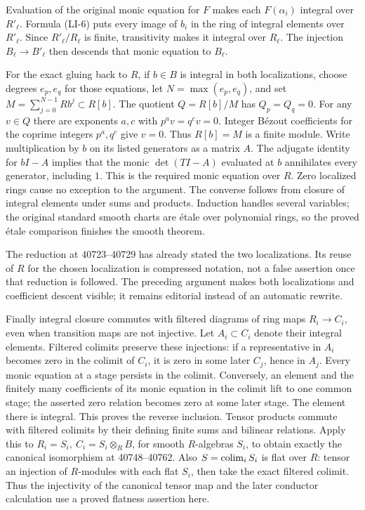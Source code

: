 Evaluation of the original monic equation for \(F\) makes each \(F(\alpha_i)\) integral over \(R'_\ell\). Formula (LI-6) puts every image of \(b_i\) in the ring of integral elements over \(R'_\ell\). Since \(R'_\ell/R_\ell\) is finite, transitivity makes it integral over \(R_\ell\). The injection \(B_\ell\to B'_\ell\) then descends that monic equation to \(B_\ell\).

For the exact gluing back to \(R\), if \(b\in B\) is integral in both localizations, choose degrees \(e_p,e_q\) for those equations, let \(N=\max(e_p,e_q)\), and set \(M=\sum_{j=0}^{N-1}Rb^j\subset R[b]\). The quotient \(Q=R[b]/M\) has \(Q_p=Q_q=0\). For any \(v\in Q\) there are exponents \(a,c\) with \(p^av=q^cv=0\). Integer Bézout coefficients for the coprime integers \(p^a,q^c\) give \(v=0\). Thus \(R[b]=M\) is a finite module. Write multiplication by \(b\) on its listed generators as a matrix \(A\). The adjugate identity for \(bI-A\) implies that the monic \(\det(TI-A)\) evaluated at \(b\) annihilates every generator, including \(1\). This is the required monic equation over \(R\). Zero localized rings cause no exception to the argument. The converse follows from closure of integral elements under sums and products. Induction handles several variables; the original standard smooth charts are étale over polynomial rings, so the proved étale comparison finishes the smooth theorem.

The reduction at 40723--40729 has already stated the two localizations. Its reuse of \(R\) for the chosen localization is compressed notation, not a false assertion once that reduction is followed. The preceding argument makes both localizations and coefficient descent visible; it remains editorial instead of an automatic rewrite.

Finally integral closure commutes with filtered diagrams of ring maps \(R_i\to C_i\), even when transition maps are not injective. Let \(A_i\subset C_i\) denote their integral elements. Filtered colimits preserve these injections: if a representative in \(A_i\) becomes zero in the colimit of \(C_i\), it is zero in some later \(C_j\), hence in \(A_j\). Every monic equation at a stage persists in the colimit. Conversely, an element and the finitely many coefficients of its monic equation in the colimit lift to one common stage; the asserted zero relation becomes zero at some later stage. The element there is integral. This proves the reverse inclusion. Tensor products commute with filtered colimits by their defining finite sums and bilinear relations. Apply this to \(R_i=S_i,\ C_i=S_i\otimes_R B\), for smooth \(R\)-algebras \(S_i\), to obtain exactly the canonical isomorphism at 40748--40762. Also \(S=\mathop{\rm colim}_iS_i\) is flat over \(R\): tensor an injection of \(R\)-modules with each flat \(S_i\), then take the exact filtered colimit. Thus the injectivity of the canonical tensor map and the later conductor calculation use a proved flatness assertion here.

